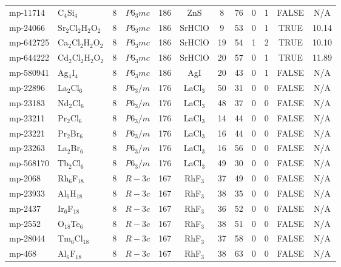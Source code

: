 {\begin{longtable}{llcccccccccc}
    mp-11714 & C$_{4}$Si$_{4}$ & 8     & $P6_3mc$ & 186   & ZnS   & 8     & 76    & 0     & 1     & FALSE & N/A \\
    mp-24066 & Sr$_{2}$Cl$_{2}$H$_{2}$O$_{2}$ & 8     & $P6_3mc$ & 186   & SrHClO & 9     & 53    & 0     & 1     & TRUE  & 10.14  \\
    mp-642725 & Ca$_{2}$Cl$_{2}$H$_{2}$O$_{2}$ & 8     & $P6_3mc$ & 186   & SrHClO & 19    & 54    & 1     & 2     & TRUE  & 10.10  \\
    mp-644222 & Cd$_{2}$Cl$_{2}$H$_{2}$O$_{2}$ & 8     & $P6_3mc$ & 186   & SrHClO & 20    & 57    & 0     & 1     & TRUE  & 11.89  \\
    mp-580941 & Ag$_{4}$I$_{4}$ & 8     & $P6_3mc$ & 186   & AgI   & 20    & 43    & 0     & 1     & FALSE & N/A \\
    mp-22896 & La$_{2}$Cl$_{6}$ & 8     & $P6_3/m$ & 176   & LaCl$_{3}$ & 50    & 31    & 0     & 0     & FALSE & N/A \\
    mp-23183 & Nd$_{2}$Cl$_{6}$ & 8     & $P6_3/m$ & 176   & LaCl$_{3}$ & 48    & 37    & 0     & 0     & FALSE & N/A \\
    mp-23211 & Pr$_{2}$Cl$_{6}$ & 8     & $P6_3/m$ & 176   & LaCl$_{3}$ & 14    & 44    & 0     & 0     & FALSE & N/A \\
    mp-23221 & Pr$_{2}$Br$_{6}$ & 8     & $P6_3/m$ & 176   & LaCl$_{3}$ & 16    & 44    & 0     & 0     & FALSE & N/A \\
    mp-23263 & La$_{2}$Br$_{6}$ & 8     & $P6_3/m$ & 176   & LaCl$_{3}$ & 16    & 56    & 0     & 0     & FALSE & N/A \\
    mp-568170 & Tb$_{2}$Cl$_{6}$ & 8     & $P6_3/m$ & 176   & LaCl$_{3}$ & 49    & 30    & 0     & 0     & FALSE & N/A \\
    mp-2068 & Rh$_{6}$F$_{18}$ & 8     & $R-3c$ & 167   & RhF$_{3}$ & 37    & 49    & 0     & 0     & FALSE & N/A \\
    mp-23933 & Al$_{6}$H$_{18}$ & 8     & $R-3c$ & 167   & RhF$_{3}$ & 38    & 35    & 0     & 0     & FALSE & N/A \\
    mp-2437 & Ir$_{6}$F$_{18}$ & 8     & $R-3c$ & 167   & RhF$_{3}$ & 36    & 52    & 0     & 0     & FALSE & N/A \\
    mp-2552 & O$_{18}$Te$_{6}$ & 8     & $R-3c$ & 167   & RhF$_{3}$ & 38    & 51    & 0     & 0     & FALSE & N/A \\
    mp-28044 & Tm$_{6}$Cl$_{18}$ & 8     & $R-3c$ & 167   & RhF$_{3}$ & 37    & 58    & 0     & 0     & FALSE & N/A \\
    mp-468 & Al$_{6}$F$_{18}$ & 8     & $R-3c$ & 167   & RhF$_{3}$ & 38    & 63    & 0     & 0     & FALSE & N/A \\

\end{longtable}}

